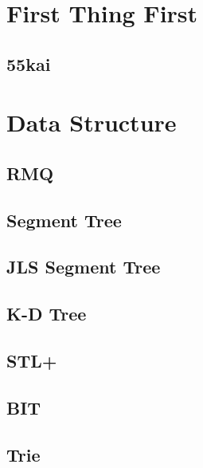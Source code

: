 \section{First Thing First}
\subsection{55kai}
\raggedbottom
\hrulefill

\section{Data Structure}
\subsection{RMQ}
\raggedbottom
\hrulefill
\subsection{Segment Tree}
\raggedbottom
\hrulefill
\subsection{JLS Segment Tree}
\raggedbottom
\hrulefill
\subsection{K-D Tree}
\raggedbottom
\hrulefill
\subsection{STL+}
\raggedbottom
\hrulefill
\subsection{BIT}
\raggedbottom
\hrulefill
\subsection{Trie}
\raggedbottom
\hrulefill
